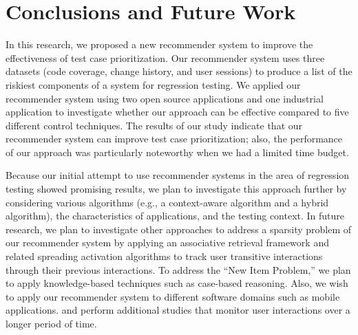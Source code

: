 \vspace*{3pt}
\section{Conclusions and Future Work}
\label{sec:conclusions}

In this research, we proposed a new recommender system to 
improve the effectiveness of test case prioritization. 
Our recommender system uses three datasets (code coverage, change history, and user sessions)
to produce a list of the riskiest components of a system for regression testing.
We applied our recommender system using two open source applications and 
one industrial application to investigate whether our approach 
can be effective compared to five different control techniques.
The results of our study indicate that our recommender system can  
improve test case prioritization; also, the performance of our approach 
was particularly noteworthy  when we had a limited time budget. 

Because our initial attempt to use recommender systems in the area of regression 
testing showed promising results, we plan to investigate this approach further
by considering various algorithms (e.g., a context-aware algorithm and a hybrid algorithm), 
the characteristics of applications, and the testing context.
In future research, we plan to investigate other approaches 
to address a sparsity problem of our recommender system by applying an associative
retrieval framework and related spreading activation algorithms
to track user transitive interactions through their previous interactions. 
To address the ``New Item Problem,'' we plan to apply 
knowledge-based techniques such as case-based reasoning. 
Also, we wish to apply our recommender system to different software domains 
such as mobile applications.
and perform additional studies that
monitor user interactions over a longer period of time.

